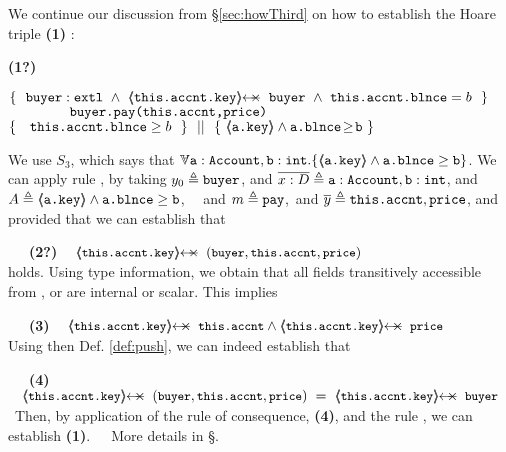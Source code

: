 \begin{example}
We continue our discussion from \S \ref{sec:howThird} on how to establish the Hoare triple    \textbf{(1)} :

 \vspace{.05cm}
  \begin{minipage}{.05\textwidth}
   \textbf{(1?)}\ \ 
\end{minipage}
\hfill
\begin{minipage}{.95\textwidth}
\begin{flushleft}
$\{\  \   \external{\prg{buyer}} \ \wedge\ 
   {\protectedFrom {\prg{this.\myAccount.key}}  {\prg{buyer} } }
 \ \wedge\ \prg{this.\myAccount.\balance}= b  \ \  \}$\\
$\ \ \ \ \ \ \ \ \ \ \ \ {\ \mbox{\normalfont{\texttt{buyer.pay(this.accnt,price)}}}   \ } $\\
$  \{\  \ \  {\mbox{\normalfont{\texttt{this.\mbox{\normalfont{\texttt{accnt}}}.\mbox{\normalfont{\texttt{blnce}}}}}}} \geq  b \  \  \} \ \ ||\ \  \{\ \langle\!\!\langle \mbox{\normalfont{\texttt{a.key}}} \rangle\!\!\rangle\wedge  \mbox{\normalfont{\texttt{a.\mbox{\normalfont{\texttt{blnce}}}}}}\!\geq\!{\mbox{\normalfont{\texttt{b}}}}   \ \}  $ 
\end{flushleft}
\end{minipage}
 
\vspace{.03cm}
\noindent
We use $S_3$, which says that $\TwoStatesN{ \prg{a}:\prg{Account},\prg{b}:\prg{int} } {\inside{\prg{a.key}} \wedge \prg{a.\balance} \geq \prg{b} }$. 
We can apply rule {}, by taking  $y_0 \triangleq \mbox{\normalfont{\texttt{buyer}}}$,  and $\overline {x : D}\triangleq \mbox{\normalfont{\texttt{a}}}:\mbox{\normalfont{\texttt{Account}}},\mbox{\normalfont{\texttt{b}}}:\mbox{\normalfont{\texttt{int}}}$, 
and $A \triangleq  \langle\!\!\langle \mbox{\normalfont{\texttt{a.key}}} \rangle\!\!\rangle\wedge \mbox{\normalfont{\texttt{a.\mbox{\normalfont{\texttt{blnce}}}}}}\geq \mbox{\normalfont{\texttt{b}}}$, \ \ 
and $m \triangleq \mbox{\normalfont{\texttt{pay}}}$,\ and $\overline {y} \triangleq \mbox{\normalfont{\texttt{this.accnt}}},\mbox{\normalfont{\texttt{price}}}$,
and provided that we can establish that\\
\strut \ \ \   \textbf{(2?)}  $ {\small{\strut \ \ \ \protectedFrom {} {(\prg{buyer},\prg{this.\myAccount},)}}}$\\
holds. Using type information, we obtain that all fields transitively accessible from \prg{this.\myAccount.key}, or \prg{price} are internal or scalar. This implies\\
\strut \ \ \   \textbf{(3)}  $ {\small{\strut \ \ \ \protectedFrom {\prg{this.\myAccount.key}} {\prg{this.\myAccount}} \wedge  \protectedFrom {\prg{this.\myAccount.key}} {\prg{price}}}} $\\
Using then    Def. \ref{def:push},  we can indeed establish that\\
\strut \ \ \   \textbf{(4)} $ {\small{\strut \ \ \ \protectedFrom {\prg{this.\myAccount.key}} {(\prg{buyer},\prg{this.\myAccount},\prg{price})}  \ = \   \protectedFrom {\prg{this.\myAccount.key}} {\prg{buyer}}}}$\
Then, by application of the rule of consequence, \textbf{(4)}, and the rule {}, we can establish \textbf{(1)}.\ \ \ 
More details in \S  {}.
\end{example}

